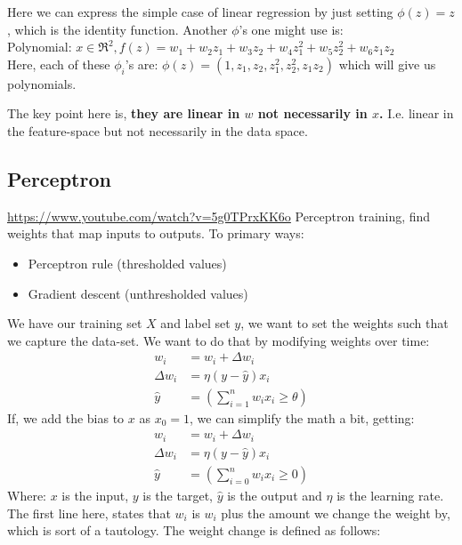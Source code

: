     Here we can express the simple case of linear regression by just setting 
    $\phi(z) = z$, which is the identity function. Another $\phi$'s one might 
    use is:\\
    Polynomial: $x\in \Re^2, 
    f(z)=w_1+w_2z_1+w_3z_2+w_4z_1^2+w_5z_2^2+w_6z_1z_2$\\
    Here, each of these $\phi_i$'s are: $\phi(z)=(1,z_1, z_2, z_1^2, z_2^2, 
    z_1z_2)$ which will give us polynomials.
    
   The key point here is, \textbf{they are linear in $w$ not necessarily in 
   $x$.} I.e. linear in the feature-space but not necessarily in the data space.

    \subsection{Perceptron}
    \url{https://www.youtube.com/watch?v=5g0TPrxKK6o}
    Perceptron training, find weights that map inputs to outputs. To primary 
    ways:
    \begin{itemize}
        \item Perceptron rule (thresholded values)
        \item Gradient descent (unthresholded values)
    \end{itemize}
    We have our training set $X$ and label set $y$, we want to set the weights 
    such that we capture the data-set. We want to do that by modifying weights 
    over time:
    \begin{align*}
        w_i &= w_i + \Delta w_i\\
        \Delta w_i &= \eta(y-\hat{y})x_i\\
        \hat{y} &= (\sum_{i=1}^n w_ix_i \geq \theta)
    \end{align*}
    If, we add the bias to $x$ as $x_0=1$, we can simplify the math a bit, 
    getting:
    \begin{align*}
    w_i &= w_i + \Delta w_i\\
    \Delta w_i &= \eta(y-\hat{y})x_i\\
    \hat{y} &= (\sum_{i=0}^n w_ix_i \geq 0)
    \end{align*}
    Where: $x$ is the input, $y$ is the target, $\hat{y}$ is the output and 
    $\eta$ 
    is the learning rate.\\
    The first line here, states that $w_i$ is $w_i$ plus the amount we change 
    the weight by, which is sort of a tautology. The weight change is defined 
    as follows:\\
